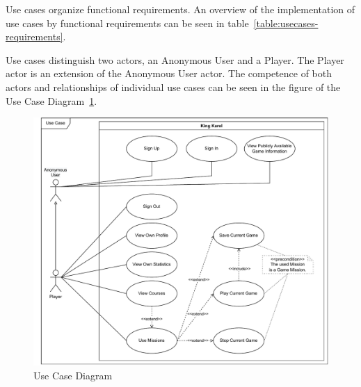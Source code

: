 Use cases organize functional requirements. 
An overview of the implementation of use cases by functional requirements can be seen in table~\ref{table:usecases-requirements}.

Use cases distinguish two actors, an Anonymous User and a Player.
The Player actor is an extension of the Anonymous User actor.
The competence of both actors and relationships of individual use cases can be seen in the figure of the Use Case Diagram~\ref{fig:usecasediagram}.

\begin{figure}
    \centering
    \includegraphics[width=1\linewidth]{assets/design/usecasediagram.pdf}
    \caption{Use Case Diagram}
    \label{fig:usecasediagram}
\end{figure}
